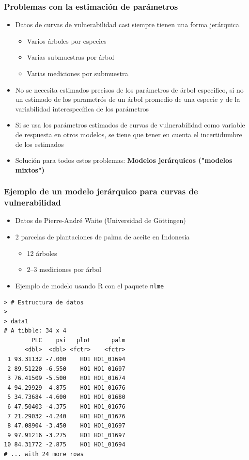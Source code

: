 \documentclass[usepdftitle=false]{beamer}
\newcommand{\Rar}{$\Rightarrow$}
\begin{document}
	
	\begin{frame}
		\frametitle{Problemas con la estimación de parámetros}
		\begin{itemize}
			\item<1-> Datos de curvas de vulnerabilidad casi siempre tienen una \alert<1>{forma jerárquica}
			\begin{itemize}
				\item Varios árboles por especies
				\item Varias submuestras por árbol
				\item Varias mediciones por submuestra
			\end{itemize}
			\item<2-> No se necesita estimados precisos de los parámetros de {\alert<2>{árbol especifico}}, si no un estimado de los parametrós de un {\alert<2>{árbol promedio}} de una especie y de la variabilidad interespecífica de los parámetros
			\item<3-> Si se usa los parámetros estimados de curvas de vulnerabilidad como variable de respuesta en otros modelos, se tiene que tener en cuenta el \alert<3>{incertidumbre de los estimados}
			\item<visible@4| alert@4>[\Rar] Solución para todos estos problemas: \textbf{Modelos jerárquicos ("modelos mixtos")}
		\end{itemize}	
	\end{frame}	
		
\begin{frame}
\frametitle{Ejemplo de un modelo jerárquico para curvas de vulnerabilidad}
\begin{itemize}
\item<1-> Datos de Pierre-André Waite (Universidad de Göttingen) 

\item<2-> 2 parcelas de plantaciones de palma de aceite en Indonesia
\begin{itemize}
\item 12 árboles
\item 2--3 mediciones por árbol
\end{itemize}
\item<3> Ejemplo de modelo usando R con el paquete \texttt{nlme} 
\end{itemize} 

\end{frame}	

\begin{frame}[fragile]
\begin{lstlisting}
> # Estructura de datos
>
> data1 
# A tibble: 34 x 4
        PLC    psi   plot      palm
      <dbl>  <dbl> <fctr>    <fctr>
 1 93.31132 -7.000    HO1 HO1_01694
 2 89.51220 -6.550    HO1 HO1_01697
 3 76.41509 -5.500    HO1 HO1_01674
 4 94.29929 -4.875    HO1 HO1_01676
 5 34.73684 -4.600    HO1 HO1_01680
 6 47.50403 -4.375    HO1 HO1_01676
 7 21.29032 -4.240    HO1 HO1_01676
 8 47.08904 -3.450    HO1 HO1_01697
 9 97.91216 -3.275    HO1 HO1_01697
10 84.31772 -2.875    HO1 HO1_01694
# ... with 24 more rows
\end{lstlisting}
\end{frame}		
\end{document}

